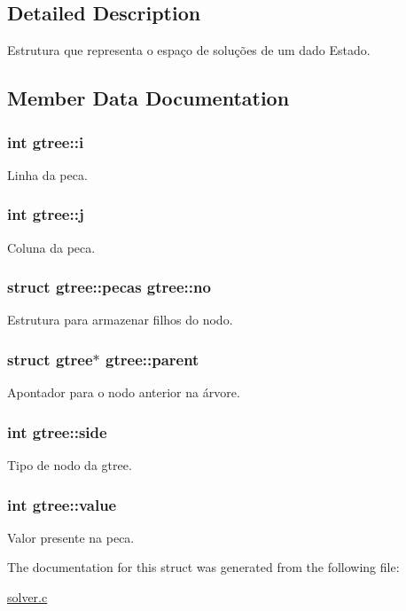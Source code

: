 \subsection{Detailed Description}
Estrutura que representa o espaço de soluções de um dado Estado. 

\subsection{Member Data Documentation}
\hypertarget{structgtree_adc3b4827f553f4791f357b0dfa35909c}{
\subsubsection[{i}]{\setlength{\rightskip}{0pt plus 5cm}int gtree\+::i}}\label{structgtree_adc3b4827f553f4791f357b0dfa35909c}
Linha da peca. \hypertarget{structgtree_a27e5ef16fc462e2cc8a22f32ed74c4d7}{
\subsubsection[{j}]{\setlength{\rightskip}{0pt plus 5cm}int gtree\+::j}}\label{structgtree_a27e5ef16fc462e2cc8a22f32ed74c4d7}
Coluna da peca. \hypertarget{structgtree_a9f38e15f251baa31c64e318434d17b0a}{
\subsubsection[{no}]{\setlength{\rightskip}{0pt plus 5cm}struct {\bf gtree\+::pecas}  gtree\+::no}}\label{structgtree_a9f38e15f251baa31c64e318434d17b0a}
Estrutura para armazenar filhos do nodo. \hypertarget{structgtree_ac1cb61353a3071797136ae875d897c8d}{
\subsubsection[{parent}]{\setlength{\rightskip}{0pt plus 5cm}struct {\bf gtree}$\ast$ gtree\+::parent}}\label{structgtree_ac1cb61353a3071797136ae875d897c8d}
Apontador para o nodo anterior na árvore. \hypertarget{structgtree_aa846f96e7fe88d420efe940ba26600b1}{
\subsubsection[{side}]{\setlength{\rightskip}{0pt plus 5cm}int gtree\+::side}}\label{structgtree_aa846f96e7fe88d420efe940ba26600b1}
Tipo de nodo da gtree. \hypertarget{structgtree_a0eb754f1a6a1ffb0318bf6a37cdabba1}{
\subsubsection[{value}]{\setlength{\rightskip}{0pt plus 5cm}int gtree\+::value}}\label{structgtree_a0eb754f1a6a1ffb0318bf6a37cdabba1}
Valor presente na peca. 

The documentation for this struct was generated from the following file\+:\begin{DoxyCompactItemize}
\item 
\hyperlink{solver_8c}{solver.\+c}\end{DoxyCompactItemize}
